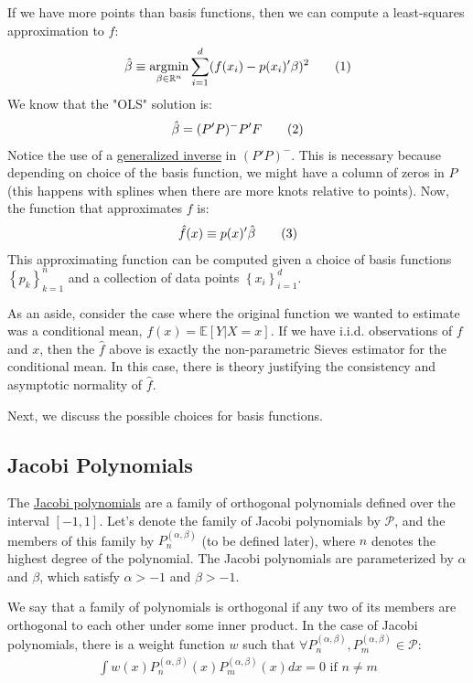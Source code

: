 \documentclass[12pt, a4paper]{article}
\newcommand\numberthis{\addtocounter{equation}{1}\tag{\theequation}}
\newcommand{\E}[1]{\mathbb{E}{\left[#1\right]}}
\newcommand{\Set}[1]{\left\{#1\right\}}
\DeclareMathOperator*{\argmin}{\arg\!\min}
\begin{document}
If we have more points than basis functions, then we can compute a least-squares approximation to \(f\):
\begin{align*}
\hat{\beta} \equiv \argmin_{\beta\in\mathbb{R}^n}{\sum_{i=1}^d(f(x_i) - p(x_i)'\beta)^2}\numberthis{}\label{eq:890_matlab_sieves_problem}
\end{align*}
We know that the "OLS" solution is:
\begin{align*}
\hat{\beta}=(P'P)^{-}P'F\numberthis{}\label{eq:890_matlab_ols_solution}
\end{align*}
Notice the use of a \href{https://en.wikipedia.org/wiki/Moore–Penrose\_inverse}{generalized inverse} in \((P'P)^{-}\).
This is necessary because depending on choice of the basis function, we might have a column of zeros in \(P\) (this happens with splines when there are more knots relative to points).
Now, the function that approximates \(f\) is:
\begin{align*}
\hat{f}(x) \equiv p(x)'\hat{\beta}\numberthis{}\label{eq:890_matlab_fhat}
\end{align*}
This approximating function can be computed given a choice of basis functions \(\Set{p_k}_{k=1}^n\) and a collection of data points \(\Set{x_i}_{i=1}^d\).

As an aside, consider the case where the original function we wanted to estimate was a conditional mean, \(f(x)=\E{Y\vert X=x}\).
If we have i.i.d. observations of \(f\) and \(x\), then the \(\hat{f}\) above is exactly the non-parametric Sieves estimator for the conditional mean.
In this case, there is theory justifying the consistency and asymptotic normality of \(\hat{f}\).

Next, we discuss the possible choices for basis functions.
\subsection{Jacobi Polynomials}
\label{sec:orge3f4007}
The \href{https://en.wikipedia.org/wiki/Jacobi\_polynomials\#Orthogonality}{Jacobi polynomials} are a family of orthogonal polynomials defined over the interval \([-1, 1]\).
Let's denote the family of Jacobi polynomials by \(\mathcal{P}\), and the members of this family by \(P_n^{(\alpha,\beta)}\) (to be defined later), where \(n\) denotes the highest degree of the polynomial.
The Jacobi polynomials are parameterized by \(\alpha\) and \(\beta\), which satisfy \(\alpha>-1\) and \(\beta>-1\).

We say that a family of polynomials is orthogonal if any two of its members are orthogonal to each other under some inner product.
In the case of Jacobi polynomials, there is a weight function \(w\) such that \(\forall P_n^{(\alpha, \beta)}, P_m^{(\alpha, \beta)} \in\mathcal{P}\):
\begin{align*}
\int w(x)P_n^{(\alpha, \beta)}(x) P_m^{(\alpha, \beta)}(x)dx = 0 \text{ if } n\neq m
\end{align*}
\end{document}
